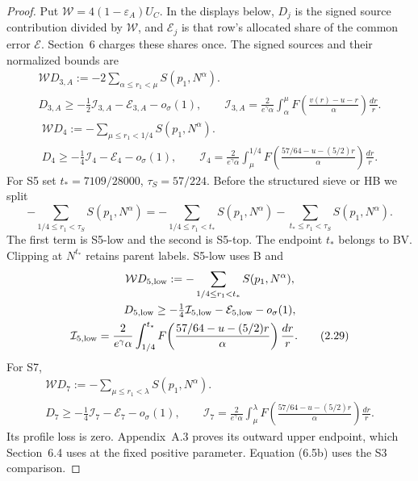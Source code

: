 \begin{proof}
Put $\mathcal W=4(1-\varepsilon_A)U_C$.
In the displays below, $D_j$ is the signed source contribution divided by
$\mathcal W$, and $\mathcal E_j$ is that row's allocated share of the
common error $\mathcal E$. Section~6 charges these shares once.
The signed sources and their normalized bounds are
\begin{gather}
 \mathcal W D_{3,A}:=-2\sum_{\alpha\le r_1<\mu}S(p_1,N^\alpha).
 \tag{2.24}\label{p2:eq:2.24}\\
 D_{3,A}\ge-\frac12\mathcal I_{3,A}-\mathcal E_{3,A}-o_\sigma(1),\qquad
 \mathcal I_{3,A}=\frac{2}{e^\gamma\alpha}
 \int_\alpha^\mu F\!\left(\frac{v(r)-u-r}{\alpha}\right)\frac{dr}{r}.
 \tag{2.25}\label{p2:eq:2.25}
\end{gather}
\begin{gather}
 \mathcal W D_4:=-\sum_{\mu\le r_1<1/4}S(p_1,N^\alpha).
 \tag{2.26}\label{p2:eq:2.26}\\
 D_4\ge-\tfrac14\mathcal I_4-\mathcal E_4-o_\sigma(1),\qquad
 \mathcal I_4=\frac{2}{e^\gamma\alpha}
 \int_\mu^{1/4}F\!\left(\frac{57/64-u-(5/2)r}{\alpha}\right)\frac{dr}{r}.
 \tag{2.27}\label{p2:eq:2.27}
\end{gather}
For S5 set $t_*=7109/28000$, $\tau_S=57/224$.
Before the structured sieve or HB we split
\[
 -\sum_{1/4\le r_1<\tau_S}S(p_1,N^\alpha)
 =-\sum_{1/4\le r_1<t_*}S(p_1,N^\alpha)
  -\sum_{t_*\le r_1<\tau_S}S(p_1,N^\alpha).
 \tag{2.28}\label{p2:eq:2.28}
\]
The first term is S5-low and the second is S5-top.
The endpoint $t_*$ belongs to BV.
Clipping at $N^{t_*}$ retains parent labels.
S5-low uses B and
\begin{gather}
 \mathcal W D_{5,\rm low}:=-\sum_{1/4\le r_1<t_*}S(p_1,N^\alpha),\notag\\
 D_{5,\rm low}\ge-\tfrac14\mathcal I_{5,\rm low}
                 -\mathcal E_{5,\rm low}-o_\sigma(1),\notag\\
 \mathcal I_{5,\rm low}=\frac{2}{e^\gamma\alpha}
 \int_{1/4}^{t_*}F\!\left(\frac{57/64-u-(5/2)r}{\alpha}\right)\frac{dr}{r}.
 \tag{2.29}\label{p2:eq:2.29}
\end{gather}
For S7,
\begin{gather}
 \mathcal W D_7:=-\sum_{\mu\le r_1<\lambda}S(p_1,N^\alpha).
 \tag{2.30}\label{p2:eq:2.30}\\
 D_7\ge-\tfrac14\mathcal I_7-\mathcal E_7-o_\sigma(1),\qquad
 \mathcal I_7=\frac{2}{e^\gamma\alpha}\int_\mu^\lambda
 F\!\left(\frac{57/64-u-(5/2)r}{\alpha}\right)\frac{dr}{r}.
 \tag{2.31}\label{p2:eq:2.31}
\end{gather}
Its profile loss is zero.
Appendix~A.3 proves its outward upper endpoint,
which Section~6.4 uses at the fixed positive parameter.
Equation (6.5b) uses the S3 comparison.


\end{proof}
